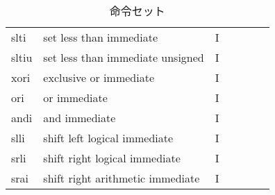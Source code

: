 \documentclass[../specifications.tex]{subfiles}
\begin{document}
\begin{table}[h]
\begin{tabular}{|l|l|l|llll}
    slti  & set less than immediate               & I  &                       &                             &                                                    &                         \\
    sltiu & set less than immediate unsigned      & I  &                       &                             &                                                    &                         \\
    xori  & exclusive or immediate                & I  &                       &                             &                                                    &                         \\
    ori   & or immediate                          & I  &                       &                             &                                                    &                         \\
    andi  & and immediate                         & I  &                       &                             &                                                    &                         \\
    slli  & shift left logical immediate          & I  &                       &                             &                                                    &                         \\
    srli  & shift right logical immediate         & I  &                       &                             &                                                    &                         \\
    srai  & shift right arithmetic immediate      & I  &                       &                             &                                                    &                         \\ \cline{1-3}
    \end{tabular}
    \caption{命令セット}
    \label{table:isa}
  \end{table}
  
\end{document}
